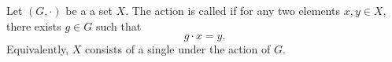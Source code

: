\begin{definition} \label{definition:transitive_group_action_of_a_group_acting_on_a_set}
Let $(G,\cdot)$ be a   a set $X$. The action is called  if for any two elements $x, y \in X$, there exists $g \in G$ such that
$$g \cdot x = y.$$
Equivalently, $X$ consists of a single  under the action of $G$.
\end{definition}
